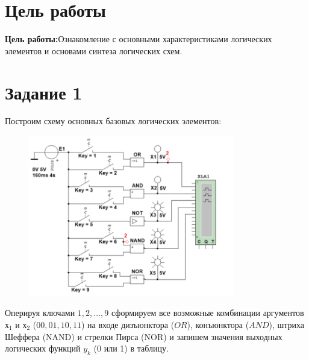 \documentclass[bachelor, och, labwork]{shiza}
\begin{document}



\tableofcontents

\section{Цель работы}
\textbf{Цель работы:}Ознакомление с основными характеристиками логических элементов 
и основами синтеза логических схем.

\section{Задание 1}
Построим схему основных базовых логических элементов:

\begin{figure}[H]
    \centering
    \includegraphics[width=0.8\textwidth]{pic1/1.png}
    \caption{}
\end{figure}

Оперируя ключами $1, 2, ..., 9$ сформируем все возможные комбинации аргументов 
$х_1$ и $х_2$ ($00, 01, 10, 11$) на входе дизъюнктора ($OR$), конъюнктора ($AND$), 
штриха Шеффера (NAND) и стрелки Пирса (NOR) и запишем значения выходных 
логических функций $y_k$ (0 или 1) в таблицу.
\end{document}
